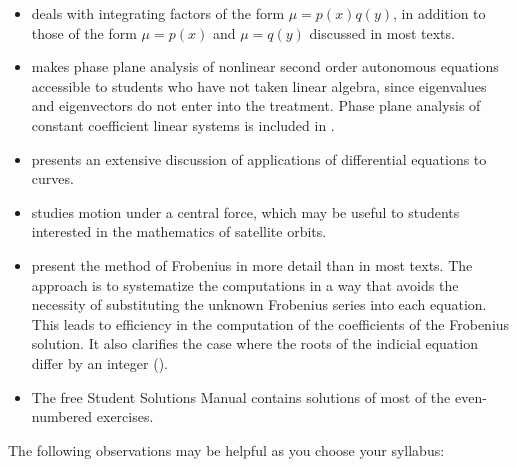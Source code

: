 \begin{itemize}

\item {} deals with integrating factors of the
form $\mu=p(x)q(y)$, in addition to those of the form $\mu=p(x)$ and
$\mu=q(y)$ discussed in most texts.

\item {} makes phase plane analysis of nonlinear
second order autonomous equations accessible to students who have not taken
linear algebra, since eigenvalues and eigenvectors do not enter into the
treatment. Phase plane analysis of constant coefficient linear systems
is included in
.

\item {} presents an extensive discussion of
applications of differential equations to curves.

\item {} studies motion under a central force,
which may be useful to students interested in the mathematics of
satellite orbits.

\item {} present the method of
Frobenius in more detail than in most texts. The approach is to systematize the
computations in a way that avoids the necessity of substituting the
unknown Frobenius series into each equation. This leads to efficiency
in the computation of the coefficients of the Frobenius solution. It
also clarifies the case where the roots of the indicial equation
differ by an integer ().

\item The free Student Solutions Manual contains solutions
of most of the even-numbered exercises.


\end{itemize}

The following observations may be helpful as you choose your
 syllabus:

